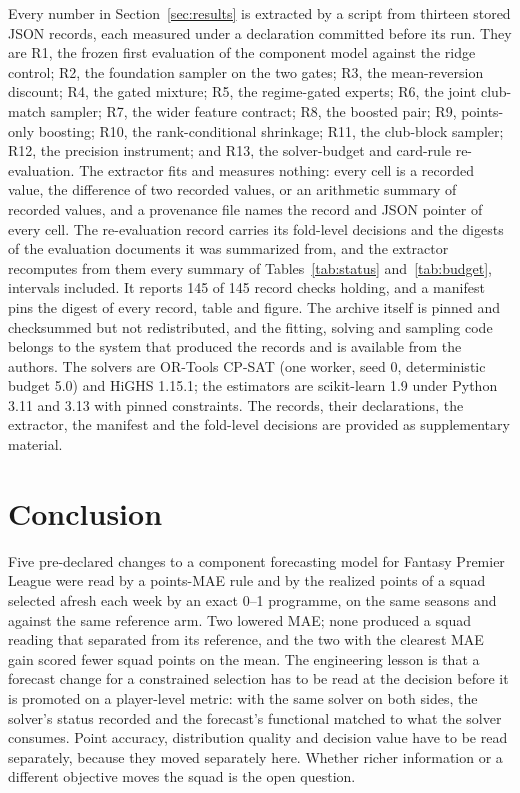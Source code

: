 \documentclass[11pt,a4paper]{article}
\begin{document}
Every number in Section~\ref{sec:results} is extracted by a script from thirteen stored JSON records, each measured under a declaration committed before its run. They are R1, the frozen first evaluation of the component model against the ridge control; R2, the foundation sampler on the two gates; R3, the mean-reversion discount; R4, the gated mixture; R5, the regime-gated experts; R6, the joint club-match sampler; R7, the wider feature contract; R8, the boosted pair; R9, points-only boosting; R10, the rank-conditional shrinkage; R11, the club-block sampler; R12, the precision instrument; and R13, the solver-budget and card-rule re-evaluation. The extractor fits and measures nothing: every cell is a recorded value, the difference of two recorded values, or an arithmetic summary of recorded values, and a provenance file names the record and JSON pointer of every cell. The re-evaluation record carries its fold-level decisions and the digests of the evaluation documents it was summarized from, and the extractor recomputes from them every summary of Tables~\ref{tab:status} and~\ref{tab:budget}, intervals included. It reports 145 of 145 record checks holding, and a manifest pins the digest of every record, table and figure. The archive itself is pinned and checksummed but not redistributed, and the fitting, solving and sampling code belongs to the system that produced the records and is available from the authors. The solvers are OR-Tools CP-SAT \cite{ortools} (one worker, seed 0, deterministic budget 5.0) and HiGHS \cite{huangfu2018} 1.15.1; the estimators are scikit-learn \cite{pedregosa2011} 1.9 under Python 3.11 and 3.13 with pinned constraints. The records, their declarations, the extractor, the manifest and the fold-level decisions are provided as supplementary material.

\section{Conclusion}

Five pre-declared changes to a component forecasting model for Fantasy Premier League were read by a points-MAE rule and by the realized points of a squad selected afresh each week by an exact 0--1 programme, on the same seasons and against the same reference arm. Two lowered MAE; none produced a squad reading that separated from its reference, and the two with the clearest MAE gain scored fewer squad points on the mean. The engineering lesson is that a forecast change for a constrained selection has to be read at the decision before it is promoted on a player-level metric: with the same solver on both sides, the solver's status recorded and the forecast's functional matched to what the solver consumes. Point accuracy, distribution quality and decision value have to be read separately, because they moved separately here. Whether richer information or a different objective moves the squad is the open question.
\end{document}
